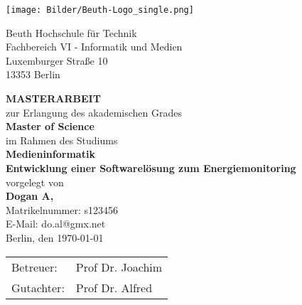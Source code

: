 \thispagestyle{empty}

\begin{titlepage}
\fontsize{12pt}{13pt}\selectfont

	\begin{minipage}{0.18\textwidth}
		\texttt{[image: Bilder/Beuth-Logo\_single.png]}
	\end{minipage}
	\begin{minipage}{1\textwidth}
			Beuth Hochschule für Technik\\
			Fachbereich VI - Informatik und Medien\\
			Luxemburger Straße 10\\
			13353 Berlin
	\end{minipage}
	
	\begin{center}

	\vspace*{2.5cm} {\textbf{ \Large MASTERARBEIT}}
	\\zur Erlangung des akademischen Grades\\ \textbf{Master of Science}\\
\vspace*{0.5cm} {im Rahmen des Studiums\\ \textbf{Medieninformatik}\\}
	\vspace*{1.5cm} {\textbf{\LARGE Entwicklung einer Softwarelösung zum Energiemonitoring}}
	\vspace*{1.5cm} \\ {vorgelegt von\\}
	\vspace{0.5cm} {\large \textbf{Dogan A,}\\Matrikelnummer: s123456\\}
	\vspace{0.5cm} {\large E-Mail: do.al@gmx.net\\}
	\vspace{1.5cm} {\large Berlin, den \today}


\end{center}

\vspace*{\fill}
\begin{table}[h]
	\begin{tabular}{ll}
		Betreuer:  & Prof Dr. Joachim \\
		Gutachter: & Prof Dr. Alfred
	\end{tabular}
\end{table}
 

\end{titlepage}